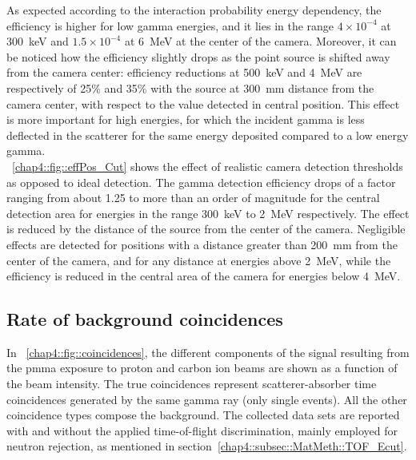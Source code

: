 As expected according to the interaction probability energy dependency, the efficiency is higher for low gamma energies, and it lies in the range $4\times10^{-4}$ at 300~keV and $1.5\times10^{-4}$ at 6~MeV at the center of the camera. Moreover, it can be noticed how the efficiency slightly drops as the point source is shifted away from the camera center: efficiency reductions at 500~keV and 4~MeV are respectively of 25\% and 35\% with the source at 300~mm distance from the camera center, with respect to the value detected in central position. This effect is more important for high energies, for which the incident gamma is less deflected in the scatterer for the same energy deposited compared to a low energy gamma.\\  
\figurename~\ref{chap4::fig::effPos_Cut} shows the effect of realistic camera detection thresholds as opposed to ideal detection. The gamma detection efficiency drops of a factor ranging from about 1.25 to more than an order of magnitude for the central detection area for energies in the range 300~keV to 2~MeV respectively. The effect is reduced by the distance of the source from the center of the camera. Negligible effects are detected for positions with a distance greater than 200~mm from the center of the camera, and for any distance at energies above 2~MeV, while the efficiency is reduced in the central area of the camera for energies below 4~MeV.\\
 
\subsection{Rate of background coincidences}
\label{chap4::subsec::Results_beamInt}
 
In \figurename~\ref{chap4::fig::coincidences}, the different components of the signal resulting from the \gls{pmma} exposure to proton and carbon ion beams are shown as a function of the beam intensity. The true coincidences represent scatterer-absorber time coincidences generated by the same gamma ray (only single events). All the other coincidence types compose the background. The collected data sets are reported with and without the applied time-of-flight discrimination, mainly employed for neutron rejection, as mentioned in section~\ref{chap4::subsec::MatMeth::TOF_Ecut}.


